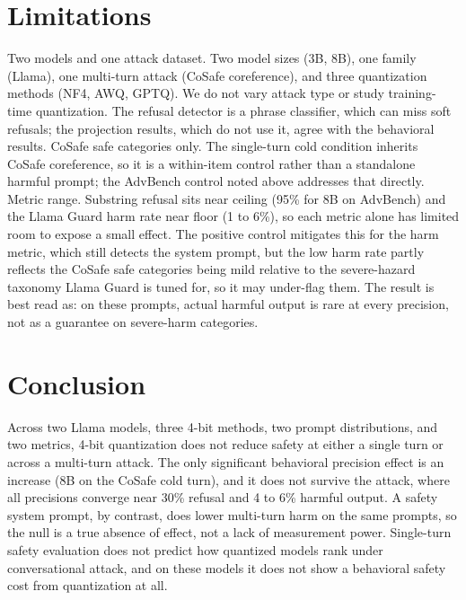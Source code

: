 \documentclass[letterpaper]{article} %
\begin{document}
\section{Limitations}
Two models and one attack dataset. Two model sizes (3B, 8B), one family (Llama),
one multi-turn attack (CoSafe coreference), and three quantization methods (NF4,
AWQ, GPTQ). We do not vary attack type or study training-time quantization. The
refusal detector is a phrase classifier, which can miss soft refusals; the
projection results, which do not use it, agree with the behavioral results.
CoSafe safe categories only. The single-turn cold condition inherits CoSafe
coreference, so it is a within-item control rather than a standalone harmful
prompt; the AdvBench control noted above addresses that directly.
Metric range. Substring refusal sits near ceiling (95\% for 8B on AdvBench) and
the Llama Guard harm rate near floor (1 to 6\%), so each metric alone has limited
room to expose a small effect. The positive control mitigates this for the harm
metric, which still detects the system prompt, but the low harm rate partly
reflects the CoSafe safe categories being mild relative to the severe-hazard
taxonomy Llama Guard is tuned for, so it may under-flag them. The result is best
read as: on these prompts, actual harmful output is rare at every precision, not
as a guarantee on severe-harm categories.

\section{Conclusion}
Across two Llama models, three 4-bit methods, two prompt distributions, and two
metrics, 4-bit quantization does not reduce safety at either a single turn or
across a multi-turn attack. The only significant behavioral precision effect is an
increase (8B on the CoSafe cold turn), and it does not survive the attack, where
all precisions converge near 30\% refusal and 4 to 6\% harmful output. A safety
system prompt, by contrast, does lower multi-turn harm on the same prompts, so the
null is a true absence of effect, not a lack of measurement power. Single-turn
safety evaluation does not predict how quantized models rank under conversational
attack, and on these models it does not show a behavioral safety cost from
quantization at all.


\end{document}
